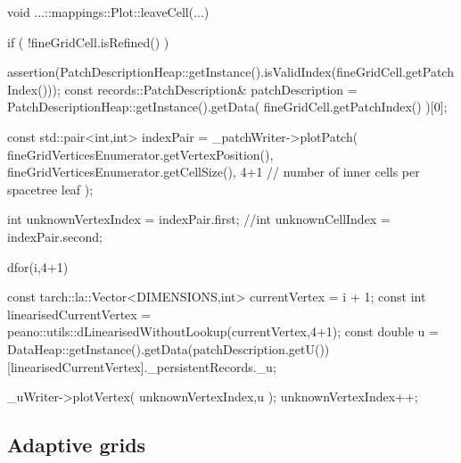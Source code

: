 \begin{code}
void ...::mappings::Plot::leaveCell(...) {
 if ( !fineGridCell.isRefined() ) {
  assertion(PatchDescriptionHeap::getInstance().isValidIndex(fineGridCell.getPatchIndex()));
  const records::PatchDescription& patchDescription   
   = PatchDescriptionHeap::getInstance().getData( fineGridCell.getPatchIndex() )[0];

  const std::pair<int,int> indexPair = _patchWriter->plotPatch(
    fineGridVerticesEnumerator.getVertexPosition(),
    fineGridVerticesEnumerator.getCellSize(),
    4+1 // number of inner cells per spacetree leaf
  );

  int unknownVertexIndex = indexPair.first;
  //int unknownCellIndex   = indexPair.second;

  dfor(i,4+1) {
   const tarch::la::Vector<DIMENSIONS,int> currentVertex = i + 1;
   const int linearisedCurrentVertex 
    = peano::utils::dLinearisedWithoutLookup(currentVertex,4+1);
   const double u = DataHeap::getInstance().getData(patchDescription.getU())
    [linearisedCurrentVertex]._persistentRecords._u;

    _uWriter->plotVertex( unknownVertexIndex,u );
    unknownVertexIndex++;
  }
 }
}
\end{code}



\subsection{Adaptive grids}

